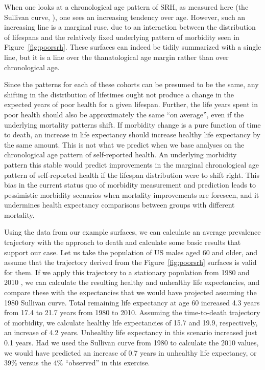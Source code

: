 \documentclass[12pt,oneside,a4paper]{article} %
\begin{document}
When one looks at a chronological age pattern of SRH, as measured
here (the Sullivan curve, \citep{Sullivan1970}), one sees an increasing tendency
over age.
However, such an increasing line is a marginal ruse, due to an interaction
between the distribution of lifespans and the relatively fixed underlying
pattern of morbidity seen in Figure~\ref{fig:poorsrh}. These surfaces can indeed
be tidily summarized with a single line, but it is a line over the
thanatological age margin rather than over chronological age. 

Since the patterns for each of these cohorts can be presumed to be the same, any
shifting in the distribution of lifetimes ought not produce a change in the
expected years of poor health for a given lifespan. Further, the life years
spent in poor health should also be approximately the same ``on average'', even
if the underlying mortality patterns shift. If morbidity change is a pure
function of time to death, an increase in life expectancy should increase
healthy life expectancy by the same amount. This is not what we predict when we
base analyses on the chronological age pattern of self-reported health. An
underlying morbidity pattern this stable would predict improvements in the
marginal chronological age pattern of self-reported health if the lifespan
distribution were to shift right. This bias in the current status quo of
morbidity measurement and prediction leads to pessimistic morbidity scenarios
when mortality improvements are foreseen, and it undermines health expectancy
comparisons between groups with different mortality.

Using the data from our example surfaces, we can calculate an average prevalence
trajectory with the approach to death and calculate some basic results that
support our case. Let us take the population of US males aged 60 and older, and
assume that the trajectory derived from the Figure~\ref{fig:poorsrh} surfaces
is valid for them.
If we apply this trajectory to a stationary population from 1980 and 2010 \citep{HMD}, we can calculate the
resulting healthy and unhealthy life expectancies, and compare these with the
expectancies that we would have projected assuming the 1980 Sullivan curve.
Total remaining life expectancy at age 60 increased 4.3 years from 17.4 to 21.7
years from 1980 to 2010. Assuming the time-to-death trajectory of
morbidity, we calculate healthy life expectancies of 15.7 and 19.9,
respectively, an increase of 4.2 years. Unhealthy life expectancy in this
scenario increased just 0.1 years. Had we used the Sullivan curve from 1980 to
calculate the 2010 values, we would have predicted an increase of 0.7 years in
unhealthy life expectancy, or 39\% versus the 4\% ``observed'' in this
exercise.
\end{document}
